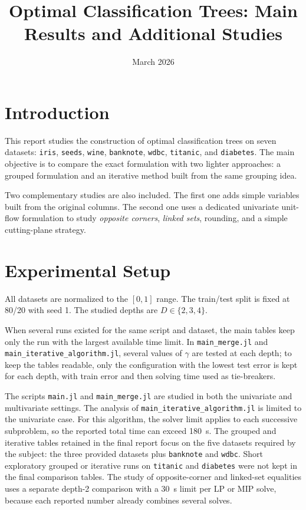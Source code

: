 \documentclass[11pt,a4paper]{article}
\title{Optimal Classification Trees: Main Results and Additional Studies}
\author{}
\date{March 2026}
\begin{document}
\maketitle

\section{Introduction}

This report studies the construction of optimal classification trees on seven datasets: \texttt{iris}, \texttt{seeds}, \texttt{wine}, \texttt{banknote}, \texttt{wdbc}, \texttt{titanic}, and \texttt{diabetes}. The main objective is to compare the exact formulation with two lighter approaches: a grouped formulation and an iterative method built from the same grouping idea.

Two complementary studies are also included. The first one adds simple variables built from the original columns. The second one uses a dedicated univariate unit-flow formulation to study \emph{opposite corners}, \emph{linked sets}, rounding, and a simple cutting-plane strategy.

\section{Experimental Setup}

All datasets are normalized to the $[0,1]$ range. The train/test split is fixed at 80/20 with seed 1. The studied depths are $D \in \{2,3,4\}$.

When several runs existed for the same script and dataset, the main tables keep only the run with the largest available time limit. In \texttt{main\_merge.jl} and \texttt{main\_iterative\_algorithm.jl}, several values of $\gamma$ are tested at each depth; to keep the tables readable, only the configuration with the lowest test error is kept for each depth, with train error and then solving time used as tie-breakers.

The scripts \texttt{main.jl} and \texttt{main\_merge.jl} are studied in both the univariate and multivariate settings. The analysis of \texttt{main\_iterative\_algorithm.jl} is limited to the univariate case. For this algorithm, the solver limit applies to each successive subproblem, so the reported total time can exceed \SI{180}{s}. The grouped and iterative tables retained in the final report focus on the five datasets required by the subject: the three provided datasets plus \texttt{banknote} and \texttt{wdbc}. Short exploratory grouped or iterative runs on \texttt{titanic} and \texttt{diabetes} were not kept in the final comparison tables. The study of opposite-corner and linked-set equalities uses a separate depth-2 comparison with a \SI{30}{s} limit per LP or MIP solve, because each reported number already combines several solves.
\end{document}
